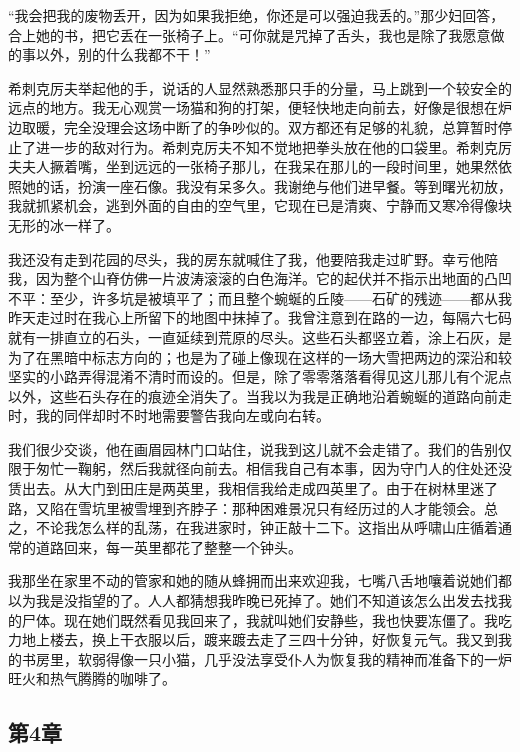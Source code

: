 \par “我会把我的废物丢开，因为如果我拒绝，你还是可以强迫我丢的。”那少妇回答，合上她的书，把它丢在一张椅子上。“可你就是咒掉了舌头，我也是除了我愿意做的事以外，别的什么我都不干！”
\par 希刺克厉夫举起他的手，说话的人显然熟悉那只手的分量，马上跳到一个较安全的远点的地方。我无心观赏一场猫和狗的打架，便轻快地走向前去，好像是很想在炉边取暖，完全没理会这场中断了的争吵似的。双方都还有足够的礼貌，总算暂时停止了进一步的敌对行为。希刺克厉夫不知不觉地把拳头放在他的口袋里。希刺克厉夫夫人撅着嘴，坐到远远的一张椅子那儿，在我呆在那儿的一段时间里，她果然依照她的话，扮演一座石像。我没有呆多久。我谢绝与他们进早餐。等到曙光初放，我就抓紧机会，逃到外面的自由的空气里，它现在已是清爽、宁静而又寒冷得像块无形的冰一样了。
\par 我还没有走到花园的尽头，我的房东就喊住了我，他要陪我走过旷野。幸亏他陪我，因为整个山脊仿佛一片波涛滚滚的白色海洋。它的起伏并不指示出地面的凸凹不平：至少，许多坑是被填平了；而且整个蜿蜒的丘陵——石矿的残迹——都从我昨天走过时在我心上所留下的地图中抹掉了。我曾注意到在路的一边，每隔六七码就有一排直立的石头，一直延续到荒原的尽头。这些石头都竖立着，涂上石灰，是为了在黑暗中标志方向的；也是为了碰上像现在这样的一场大雪把两边的深沿和较坚实的小路弄得混淆不清时而设的。但是，除了零零落落看得见这儿那儿有个泥点以外，这些石头存在的痕迹全消失了。当我以为我是正确地沿着蜿蜒的道路向前走时，我的同伴却时不时地需要警告我向左或向右转。
\par 我们很少交谈，他在画眉园林门口站住，说我到这儿就不会走错了。我们的告别仅限于匆忙一鞠躬，然后我就径向前去。相信我自己有本事，因为守门人的住处还没赁出去。从大门到田庄是两英里，我相信我给走成四英里了。由于在树林里迷了路，又陷在雪坑里被雪埋到齐脖子：那种困难景况只有经历过的人才能领会。总之，不论我怎么样的乱荡，在我进家时，钟正敲十二下。这指出从呼啸山庄循着通常的道路回来，每一英里都花了整整一个钟头。
\par 我那坐在家里不动的管家和她的随从蜂拥而出来欢迎我，七嘴八舌地嚷着说她们都以为我是没指望的了。人人都猜想我昨晚已死掉了。她们不知道该怎么出发去找我的尸体。现在她们既然看见我回来了，我就叫她们安静些，我也快要冻僵了。我吃力地上楼去，换上干衣服以后，踱来踱去走了三四十分钟，好恢复元气。我又到我的书房里，软弱得像一只小猫，几乎没法享受仆人为恢复我的精神而准备下的一炉旺火和热气腾腾的咖啡了。


\subsection{第4章}

